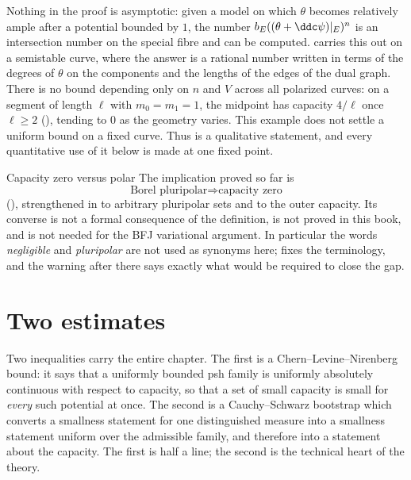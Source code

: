 \begin{remark}
\label{rem:ch25-divisorial-explicit}
Nothing in the proof is asymptotic: given a model on which $\theta$ becomes
relatively ample after a potential bounded by $1$, the number
$b_E((\theta+\ddc\psi)|_E)^n$ is an intersection number on the special
fibre and can be computed.   carries this
out on a semistable curve, where the answer is a rational number written in
terms of the degrees of $\theta$ on the components and the lengths of the
edges of the dual graph.  There is no bound depending only on $n$ and $V$ across all polarized
curves: on a segment of length $\ell$ with $m_0=m_1=1$, the midpoint has
capacity $4/\ell$ once $\ell\geq2$
(), tending to $0$ as the geometry
varies.  This example does not settle a uniform bound on a fixed curve.  Thus  is a
qualitative statement, and every quantitative use of it below is made at one
fixed point.
\end{remark}

\begin{warning}{Capacity zero versus polar}
The implication proved so far is
\[
       \text{Borel pluripolar}\Longrightarrow\text{capacity zero}
\]
(), strengthened in
 to arbitrary pluripolar sets and to the
outer capacity.  Its converse is not a formal consequence of the definition,
is not proved in this book, and is not needed for the BFJ variational
argument.  In particular the words \emph{negligible} and \emph{pluripolar}
are not used as synonyms here;  fixes the
terminology, and the warning after
 there says exactly what would be
required to close the gap.
\end{warning}

\section{Two estimates}
\label{sec:ch25-estimates}

Two inequalities carry the entire chapter.  The first is a
Chern--Levine--Nirenberg bound: it says that a uniformly bounded psh family
is uniformly absolutely continuous with respect to capacity, so that a set of
small capacity is small for \emph{every} such potential at once.  The second
is a Cauchy--Schwarz bootstrap which converts a smallness statement for one
distinguished measure into a smallness statement uniform over the admissible
family, and therefore into a statement about the capacity.  The first is
half a line; the second is the technical heart of the theory.

